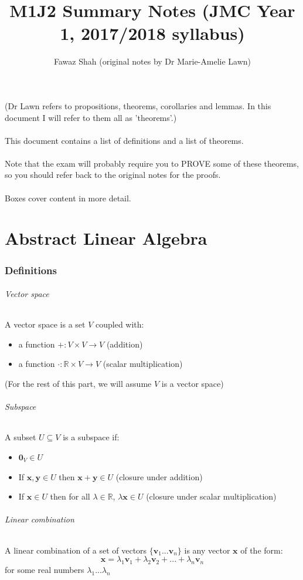 \documentclass{article}
\title{M1J2 Summary Notes (JMC Year 1, 2017/2018 syllabus)}
\date{}
\author{Fawaz Shah (original notes by Dr Marie-Amelie Lawn)}
\newcommand{\R}{\mathbb{R}}
\renewcommand{\vec}[1]{\mathbf{#1}}
\begin{document}
\large
\maketitle
\noindent (Dr Lawn refers to propositions, theorems, corollaries and lemmas. In this document I will refer to them all as 'theorems'.)
\\\\
This document contains a list of definitions and a list of theorems.
\\\\
Note that the exam will probably require you to PROVE some of these theorems, so you should refer back to the original notes for the proofs.
\\\\
Boxes cover content in more detail.
\tableofcontents
\newpage
\part{Abstract Linear Algebra}

\section{Definitions}
\paragraph{Vector space}
A vector space is a set $ V $ coupled with:
\begin{itemize}
\item a function $ + : V \times V \to V $ (addition)
\item a function $ \cdot : \R \times V \to V $ (scalar multiplication)
\end{itemize}
(For the rest of this part, we will assume $ V $ is a vector space)
\paragraph{Subspace}
A subset $ U \subseteq V $ is a subspace if:
\begin{itemize}
\item $ \vec{0}_{V} \in U $
\item If $ \vec{x}, \vec{y} \in U $ then $ \vec{x + y} \in U $ (closure under addition)
\item If $ \vec{x} \in U $ then for all $ \lambda \in \R $, $ \lambda\vec{x} \in U $ (closure under scalar multiplication)
\end{itemize}
\paragraph{Linear combination}
A linear combination of a set of vectors $ \{\vec{v}_{1}...\vec{v}_{n}\} $ is any vector $ \vec{x} $ of the form:
\begin{equation}
\vec{x} = \lambda_{1}\vec{v}_{1} + \lambda_{2}\vec{v}_{2} + ... + \lambda_{n}\vec{v}_{n}
\end{equation}
for some real numbers $ \lambda_{1}...\lambda_{n} $
\end{document}
